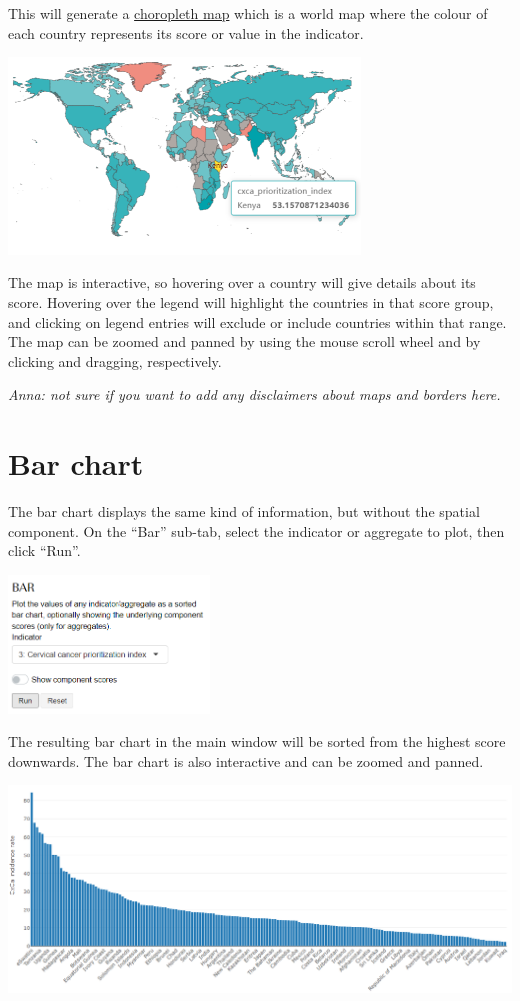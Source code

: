 \documentclass[
  letterpaper,
  DIV=11,
  numbers=noendperiod]{scrreprt}
\begin{document}
This will generate a
\href{https://en.wikipedia.org/wiki/Choropleth_map}{choropleth map}
which is a world map where the colour of each country represents its
score or value in the indicator.

\includegraphics[width=0.7\textwidth,height=\textheight]{figs/map_bar_1.png}

The map is interactive, so hovering over a country will give details
about its score. Hovering over the legend will highlight the countries
in that score group, and clicking on legend entries will exclude or
include countries within that range. The map can be zoomed and panned by
using the mouse scroll wheel and by clicking and dragging, respectively.

\emph{Anna: not sure if you want to add any disclaimers about maps and
borders here.}

\hypertarget{bar-chart}{%
\section{Bar chart}\label{bar-chart}}

The bar chart displays the same kind of information, but without the
spatial component. On the ``Bar'' sub-tab, select the indicator or
aggregate to plot, then click ``Run''.

\includegraphics[width=0.4\textwidth,height=\textheight]{figs/map_bar_3.png}

The resulting bar chart in the main window will be sorted from the
highest score downwards. The bar chart is also interactive and can be
zoomed and panned.

\includegraphics[width=1\textwidth,height=\textheight]{figs/map_bar_4.png}
\end{document}
